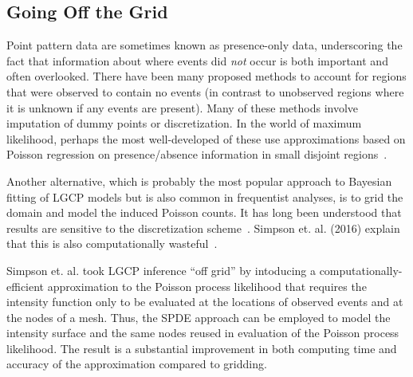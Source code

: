 \documentclass[]{interact}
\begin{document}
\subsection{Going Off the Grid}
\label{offgrid}

Point pattern data are sometimes known as presence-only data, underscoring
the fact that information about where events did \emph{not} occur is both
important and often overlooked. There have been many proposed methods to
account for regions that were observed to contain no events (in contrast to
unobserved regions where it is unknown if any events are present). Many of
these methods involve imputation of dummy points or discretization. In the
world of maximum likelihood, perhaps the most well-developed of these use
approximations based on Poisson regression on presence/absence information in
small disjoint regions~\cite{bermanturner,baddeleyturner}.

Another alternative, which is probably the most popular approach to Bayesian
fitting of LGCP models but is also common in frequentist analyses, is to grid
the domain and model the induced Poisson counts. It has long been understood
that results are sensitive to the discretization scheme~\cite{brixmoeller}.
Simpson et. al. (2016) explain that this is also computationally
wasteful~\cite{simpsonetal}.


Simpson et. al. took LGCP inference ``off grid'' by intoducing a
computationally-efficient approximation to the Poisson process likelihood that
requires the intensity function only to be evaluated at the locations of
observed events and at the nodes of a mesh. Thus, the SPDE approach can be
employed to model the intensity surface and the same nodes reused in
evaluation of the Poisson process likelihood. The result is a substantial
improvement in both computing time and accuracy of the approximation compared
to gridding.

\end{document}
